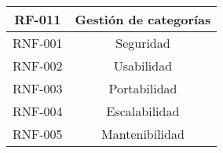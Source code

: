 \begin{longtable}{|c|c|}
RF-011 & Gestión de categorías \\
\hline

RNF-001 & Seguridad \\
\hline

RNF-002 & Usabilidad \\
\hline

RNF-003 & Portabilidad \\
\hline

RNF-004 & Escalabilidad \\
\hline

RNF-005 & Mantenibilidad \\
\hline

\end{longtable}
